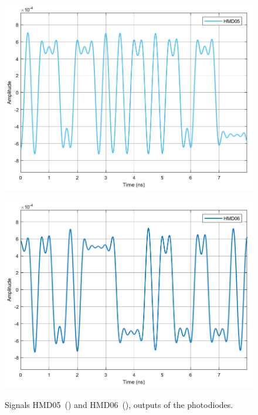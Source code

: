 	\begin{figure}[H]
	\centering
	\begin{minipage}{0.45\textwidth}
		\centering
		\includegraphics[width=1\textwidth]		
		{./sdf/m_qam_system/figures/simulations/02_thermal/HMD05.pdf}
		\subcaption{}\label{fig:sim_thermalHmd05}
	\end{minipage}
	\begin{minipage}{0.45\textwidth}
		\centering
		\includegraphics[width=1\textwidth]
		{sdf/m_qam_system/figures/simulations/02_thermal/HMD06.pdf}
		\subcaption{}\label{fig:sim_thermalHmd06}
	\end{minipage}
	\caption{Signals HMD05~() and 
		HMD06~(), outputs of the 
		photodiodes.}\label{fig:sim_thermalHmd0506}
\end{figure}

